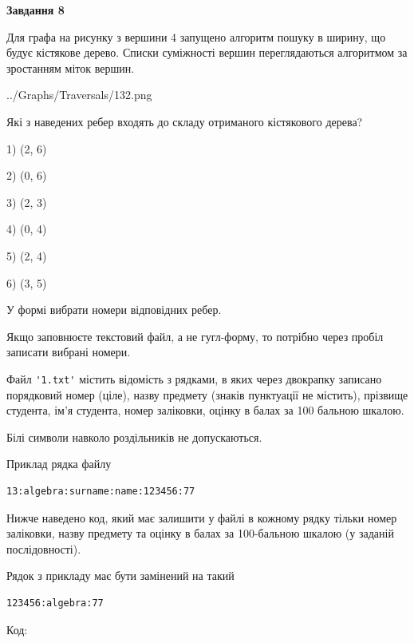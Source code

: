 \documentclass[12pt, ukrainian]{article}
\def\code#1{\Verb!#1!}
\begin{document}
{\begin {large}
{\begin {center}\textbf{Завдання 8}\end {center}}\par
Для графа на рисунку з вершини 4 запущено алгоритм пошуку в ширину, що будує кістякове дерево. Списки суміжності вершин переглядаються алгоритмом за зростанням міток вершин.\par
\begin{center}
	{../Graphs/Traversals/132.png}
\end{center}
\par Які з наведених ребер входять до складу отриманого кістякового дерева?\par
1) (2, 6)\par
2) (0, 6)\par
3) (2, 3)\par
4) (0, 4)\par
5) (2, 4)\par
6) (3, 5)\par
{\vskip 15pt} У формі вибрати номери відповідних ребер.


Якщо заповнюєте текстовий файл, а не гугл-форму, то потрібно через пробіл записа\-ти вибрані номери.\par
\newpage


Файл \code{'1.txt'} містить відомість з рядками, в яких через двокрапку записа\-но поряд\-ковий номер (ціле), назву предмету (знаків пунктуації не містить), прізвище студента, ім'я студента, номер заліковки, оцінку в балах за 100 бальною шкалою.

Білі символи навколо роздільників не допускаються.

Приклад рядка файлу



\begin{verbatim}
13:algebra:surname:name:123456:77
\end{verbatim}


Нижче наведено код, який має залишити у файлі в кожному рядку тільки номер заліковки, назву предмету та оцінку в балах за 100-бальною шкалою (у заданій послі\-дов\-ності).

Рядок з прикладу має бути замінений на такий



\begin{verbatim}
123456:algebra:77
\end{verbatim}




Код:




\end{large}}
\end{document}
